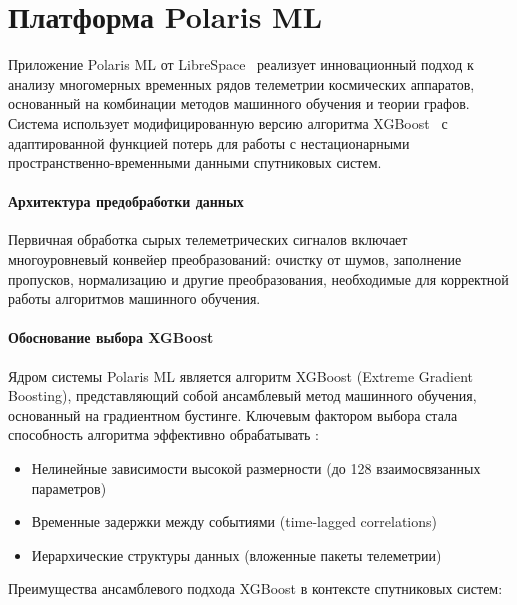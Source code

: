 \chapter{Платформа Polaris ML}

Приложение Polaris ML от LibreSpace~\cite{librespace_docs} реализует
инновационный подход к анализу многомерных временных рядов телеметрии
космических аппаратов, основанный на комбинации методов машинного обучения и
теории графов. Система использует модифицированную версию алгоритма
XGBoost~\cite{xgboost_docs} с адаптированной функцией потерь для работы с
нестационарными пространственно-временными данными спутниковых систем.

\subsubsection{Архитектура предобработки данных}

Первичная обработка сырых телеметрических сигналов включает многоуровневый
конвейер преобразований: очистку от шумов, заполнение пропусков, нормализацию и
другие преобразования, необходимые для корректной работы алгоритмов машинного
обучения.

\subsubsection{Обоснование выбора XGBoost}

Ядром системы Polaris ML является алгоритм XGBoost (Extreme Gradient Boosting),
представляющий собой ансамблевый метод машинного обучения, основанный на
градиентном бустинге. Ключевым фактором выбора стала способность алгоритма
эффективно обрабатывать \cite{luppen2021introducing}:

\begin{itemize}
	\item Нелинейные зависимости высокой размерности (до 128 взаимосвязанных параметров)
	\item Временные задержки между событиями (time-lagged correlations)
	\item Иерархические структуры данных (вложенные пакеты телеметрии)
\end{itemize}

Преимущества ансамблевого подхода XGBoost в контексте спутниковых систем:

